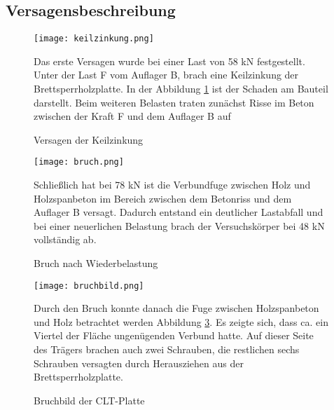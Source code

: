 \documentclass[12 pt,a4 paper ]{scrreprt}
\begin{document}
\subsection{Versagensbeschreibung}


\begin{figure}[h]
\begin{minipage}[hbt]{7cm}
	\texttt{[image: keilzinkung.png]}
	\caption{Versagen der Keilzinkung }
	\label{keilzinkung}
\end{minipage}
\hfill
\begin{minipage}[hbt]{7cm}
Das erste Versagen wurde bei einer Last von 58 kN festgestellt. Unter der Last F vom Auflager B, brach eine Keilzinkung der Brettsperrholzplatte. In der Abbildung \ref{keilzinkung} ist der Schaden am Bauteil darstellt.
Beim weiteren Belasten traten zunächst Risse im Beton zwischen der Kraft F und dem Auflager B auf
\end{minipage}
\end{figure}


\begin{figure}[h]
\begin{minipage}[hbt]{7cm}
	\texttt{[image: bruch.png]}
	\caption{Bruch nach Wiederbelastung }
	\label{bruch}
\end{minipage}
\hfill
\begin{minipage}[hbt]{7cm}
Schließlich hat bei 78 kN ist die Verbundfuge zwischen Holz und Holzspanbeton im Bereich zwischen dem Betonriss und dem Auflager B versagt. Dadurch entstand ein deutlicher Lastabfall und bei einer neuerlichen Belastung brach der Versuchskörper bei 48 kN vollständig ab.
\end{minipage}
\end{figure}

\begin{figure}
\begin{minipage}[hbt]{5cm}
	\texttt{[image: bruchbild.png]}
	\caption{Bruchbild der CLT-Platte }
	\label{bruchbild}
\end{minipage}
\hfill
\begin{minipage}[hbt]{7cm}
Durch den Bruch konnte danach die Fuge zwischen Holzspanbeton und Holz betrachtet werden Abbildung \ref{bruchbild}. Es zeigte sich, dass ca. ein Viertel der Fläche ungenügenden Verbund hatte. Auf dieser Seite des Trägers brachen auch zwei Schrauben, die restlichen sechs Schrauben versagten durch Herausziehen aus der Brettsperrholzplatte.
\end{minipage}
\end{figure}
\end{document}
